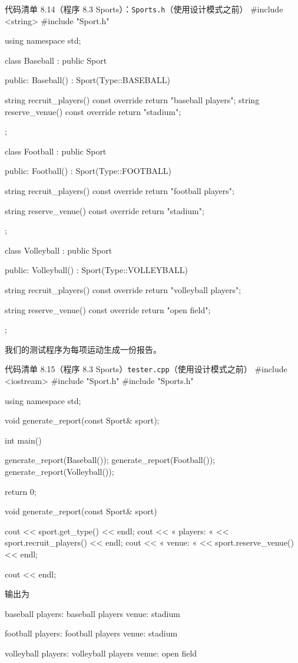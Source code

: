 \begin{codeboxt}{代码清单 8.14（程序 8.3 Sports）：\texttt{Sports.h}（使用设计模式之前）}
#include <string>
#include "Sport.h"

using namespace std;

class Baseball : public Sport
{
public:
    Baseball() : Sport(Type::BASEBALL) {}

    string recruit_players() const override
    {
        return "baseball players";
    }
    string reserve_venue() const override { return "stadium"; }
};

class Football : public Sport
{
public:
    Football() : Sport(Type::FOOTBALL) {}

    string recruit_players() const override
    {
        return "football players";
    }

    string reserve_venue() const override { return "stadium"; }
};

class Volleyball : public Sport
{
public:
    Volleyball() : Sport(Type::VOLLEYBALL) {}

    string recruit_players() const override
    {
        return "volleyball players";
    }

    string reserve_venue() const override { return "open field";}
};
\end{codeboxt}

我们的测试程序为每项运动生成一份报告。

\begin{codeboxt}{代码清单 8.15（程序 8.3 Sports）\texttt{tester.\allowbreak{}cpp}（使用设计模式之前）}
#include <iostream>
#include "Sport.h"
#include "Sports.h"

using namespace std;

void generate_report(const Sport& sport);

int main()
{
    generate_report(Baseball());
    generate_report(Football());
    generate_report(Volleyball());

    return 0;
}

void generate_report(const Sport& sport)
{
    cout << sport.get_type() << endl;
    cout << «  players: « << sport.recruit_players()  << endl;
    cout << «    venue: « << sport.reserve_venue() << endl;

    cout << endl;
}
\end{codeboxt}

输出为

\begin{codebox}
baseball
  players: baseball players
    venue: stadium

football
  players: football players
    venue: stadium

volleyball
  players: volleyball players
    venue: open field 
\end{codebox}

